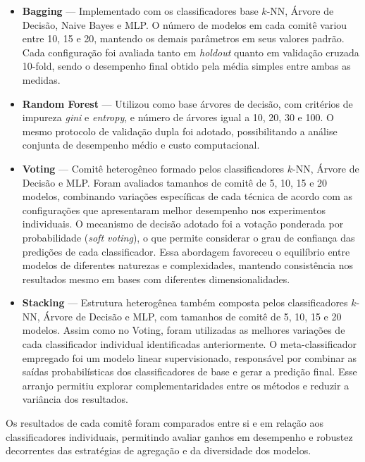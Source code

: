 \documentclass[12pt]{article}
\begin{document}
\begin{itemize}
    \item \textbf{Bagging} — Implementado com os classificadores base \(k\)-NN, Árvore de Decisão, Naive Bayes e MLP. O número de modelos em cada comitê variou entre 10, 15 e 20, mantendo os demais parâmetros em seus valores padrão. Cada configuração foi avaliada tanto em \textit{holdout} quanto em validação cruzada 10-fold, sendo o desempenho final obtido pela média simples entre ambas as medidas.

    \item \textbf{Random Forest} — Utilizou como base árvores de decisão, com critérios de impureza \textit{gini} e \textit{entropy}, e número de árvores igual a 10, 20, 30 e 100. O mesmo protocolo de validação dupla foi adotado, possibilitando a análise conjunta de desempenho médio e custo computacional.

    \item \textbf{Voting} — Comitê heterogêneo formado pelos classificadores \(k\)-NN, Árvore de Decisão e MLP. Foram avaliados tamanhos de comitê de 5, 10, 15 e 20 modelos, combinando variações específicas de cada técnica de acordo com as configurações que apresentaram melhor desempenho nos experimentos individuais.  
    O mecanismo de decisão adotado foi a votação ponderada por probabilidade (\textit{soft voting}), o que permite considerar o grau de confiança das predições de cada classificador. Essa abordagem favoreceu o equilíbrio entre modelos de diferentes naturezas e complexidades, mantendo consistência nos resultados mesmo em bases com diferentes dimensionalidades.

    \item \textbf{Stacking} — Estrutura heterogênea também composta pelos classificadores \(k\)-NN, Árvore de Decisão e MLP, com tamanhos de comitê de 5, 10, 15 e 20 modelos. Assim como no Voting, foram utilizadas as melhores variações de cada classificador individual identificadas anteriormente.  
    O meta-classificador empregado foi um modelo linear supervisionado, responsável por combinar as saídas probabilísticas dos classificadores de base e gerar a predição final. Esse arranjo permitiu explorar complementaridades entre os métodos e reduzir a variância dos resultados.  
\end{itemize}

Os resultados de cada comitê foram comparados entre si e em relação aos classificadores individuais, permitindo avaliar ganhos em desempenho e robustez decorrentes das estratégias de agregação e da diversidade dos modelos.
\end{document}
